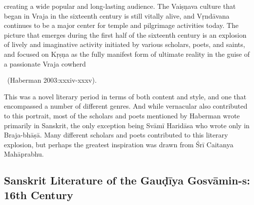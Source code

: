 \begin{myquote}
creating a wide popular and long-lasting audience. The Vaiṣṇava culture that began in Vraja in the sixteenth century is still vitally alive, and Vṛndāvana continues to be a major center for temple and pilgrimage activities today. The picture that emerges during the first half of the sixteenth century is an explosion of lively and imaginative activity initiated by various scholars, poets, and saints, and focused on Kṛṣṇa as the fully manifest form of ultimate reality in the guise of a passionate Vraja cowherd 

~\hfill(Haberman 2003:xxxiv-xxxv). 
\end{myquote}

This was a novel literary period in terms of both content and style, and one that encompassed a number of different genres. And while vernacular also contributed to this portrait, most of the scholars and poets mentioned by Haberman wrote primarily in Sanskrit, the only exception being Svāmī Haridāsa who wrote only in Braja-bhāṣā. Many different scholars and poets contributed to this literary explosion, but perhaps the greatest inspiration was drawn from Śrī Caitanya Mahāprabhu. 

\subsection*{Sanskrit Literature of the Gauḍīya Gosvāmin-s: 16th Century}

